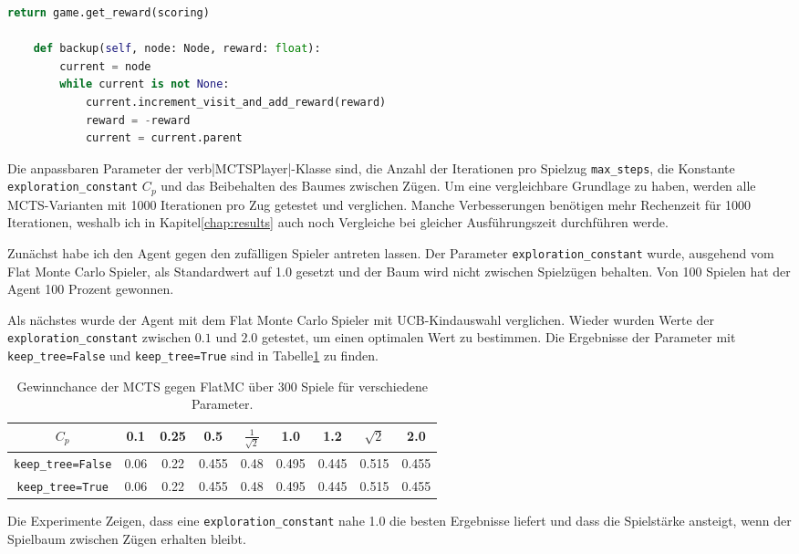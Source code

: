 \begin{lstlisting}[language=Python,caption=Die MCTSPlayer Klasse,label={lst:mcts-player}]
        return game.get_reward(scoring)

    def backup(self, node: Node, reward: float):
        current = node
        while current is not None:
            current.increment_visit_and_add_reward(reward)
            reward = -reward
            current = current.parent

\end{lstlisting}

Die anpassbaren Parameter der verb|MCTSPlayer|-Klasse sind, die Anzahl der Iterationen pro Spielzug \verb|max_steps|, die Konstante \verb|exploration_constant| $C_p$ und das Beibehalten des Baumes zwischen Zügen.
Um eine vergleichbare Grundlage zu haben, werden alle MCTS-Varianten mit 1000 Iterationen pro Zug getestet und verglichen.
Manche Verbesserungen benötigen mehr Rechenzeit für 1000 Iterationen, weshalb ich in Kapitel\~\ref{chap:results} auch noch Vergleiche bei gleicher Ausführungszeit durchführen werde.

Zunächst habe ich den Agent gegen den zufälligen Spieler antreten lassen.
Der Parameter \verb|exploration_constant| wurde, ausgehend vom Flat Monte Carlo Spieler, als Standardwert auf 1.0 gesetzt und der Baum wird nicht zwischen Spielzügen behalten.
Von 100 Spielen hat der Agent 100 Prozent gewonnen.

Als nächstes wurde der Agent mit dem Flat Monte Carlo Spieler mit UCB-Kindauswahl verglichen.
Wieder wurden Werte der \verb|exploration_constant| zwischen $0.1$ und $2.0$ getestet, um einen optimalen Wert zu bestimmen.
Die Ergebnisse der Parameter mit \verb|keep_tree=False| und \verb|keep_tree=True| sind in Tabelle\~\ref{tab:mcts-flat-mc} zu finden.

\begin{table}[h!]
\centering
\begin{tabular}{ |c||c|c|c|c|c|c|c|c| }
 \hline
 $C_p$ & 0.1 & 0.25 & 0.5 & $\frac{1}{\sqrt{2}}$ & 1.0 & 1.2 & $\sqrt{2}$ & 2.0 \\
 \hline
 \verb|keep_tree=False| & 0.06 & 0.22 & 0.455 & 0.48 & 0.495 & 0.445 & 0.515 & 0.455 \\
 \hline
 \verb|keep_tree=True| & 0.06 & 0.22 & 0.455 & 0.48 & 0.495 & 0.445 & 0.515 & 0.455 \\
 \hline
\end{tabular}
\caption{Gewinnchance der MCTS gegen FlatMC über 300 Spiele für verschiedene Parameter.}
\label{tab:mcts-flat-mc}
\end{table}

Die Experimente Zeigen, dass eine \verb|exploration_constant| nahe 1.0 die besten Ergebnisse liefert und dass die Spielstärke ansteigt, wenn der Spielbaum zwischen Zügen erhalten bleibt.

